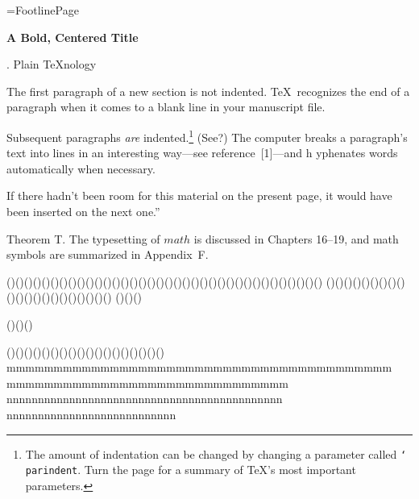 \hsize=29pc %
\vsize=42pc %
\footline={\tenrm Footline\quad\dotfill\quad Page \folio}

\topglue 1in %
\centerline{\bf A Bold, Centered Title}
\smallskip %

. Plain \TeX nology %

The first paragraph of a new section is not indented.
\TeX\ recognizes the end of a paragraph when it comes to a blank
line in your manuscript file. %

Subsequent paragraphs {\it are\/} indented.\footnote*{The amount
of indentation can be changed by changing a parameter called
{\tt\char`\\parindent}. Turn the page for a summary of \TeX's most
important parameters.} (See?) The computer breaks a paragraph's
text into lines in an interesting way---see reference~[1]---and h%
yphenates words automatically when necessary.

\midinsert %
\narrower\narrower %
\noindent {}If there hadn't been room for this material on
the present page, it would have been inserted on the next one.''
\endinsert %

\proclaim Theorem T. The typesetting of $math$ is discussed in
Chapters 16--19, and math symbols are summarized in Appendix~F.

\noindent
()()()()()()()()()()()()\break ()()()()()()()()()()()()()\break()()()()()()()()()()()
()()()()()()()()()()()()()()()()()()()()()
()()()\par
()()()\par
()()()()\break ()()()()()()()()()()()()()()
mmmmmmmmm\break mmmmmmmmmmmmmmmm\break mmmmmmmmmmmmmmmm
\break mmmmmmmmmmmmmmmm\break mmmmmmmmmmmmmm
nnnnnnnnnnnnnnnnnnnnnnnnnn\break nnnnnnnnnnnnnnnnnn
\break nnnnnnnnnnnnnnnnnnnnnnnnnnn

